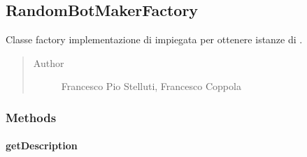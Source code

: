 \documentclass[letterpaper,10pt,italian,openany,oneside]{sphinxmanual}
\begin{document}
\begin{fulllineitems}
\label{\detokenize{source/it/unicam/cs/pa/mastermind/factories/RandomBotBreakerFactory:it.unicam.cs.pa.mastermind.factories.RandomBotBreakerFactory.getName()}}
\end{fulllineitems}



\subsection{RandomBotMakerFactory}
\label{\detokenize{source/it/unicam/cs/pa/mastermind/factories/RandomBotMakerFactory:randombotmakerfactory}}\label{\detokenize{source/it/unicam/cs/pa/mastermind/factories/RandomBotMakerFactory::doc}}

\begin{fulllineitems}
\label{\detokenize{source/it/unicam/cs/pa/mastermind/factories/RandomBotMakerFactory:it.unicam.cs.pa.mastermind.factories.RandomBotMakerFactory}}
Classe factory implementazione di  impiegata per ottenere istanze di .
\begin{quote}\begin{description}
\item[{Author}] \leavevmode
Francesco Pio Stelluti, Francesco Coppola

\end{description}\end{quote}

\end{fulllineitems}



\subsubsection{Methods}
\label{\detokenize{source/it/unicam/cs/pa/mastermind/factories/RandomBotMakerFactory:methods}}

\paragraph{getDescription}
\label{\detokenize{source/it/unicam/cs/pa/mastermind/factories/RandomBotMakerFactory:getdescription}}
\end{document}
